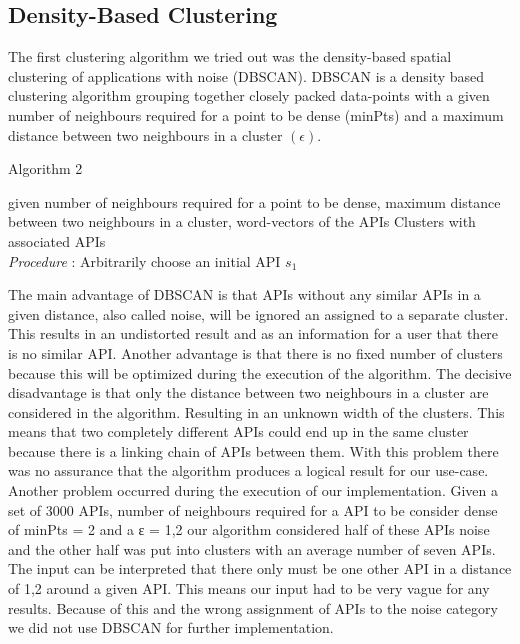 \documentclass[a4paper]{IEEEtran}
\begin{document}
\subsection{Density-Based Clustering}
The first clustering algorithm we tried out was the density-based spatial clustering of applications with noise (DBSCAN). DBSCAN\cite{kanungo2002efficient} is a density based clustering algorithm grouping together closely packed data-points with a given number of neighbours required for a point to be dense (minPts) and a maximum distance between two neighbours in a cluster $(\epsilon)$. 

\begin{algorithm}[H]
 \caption{Algorithm 2}
 \begin{algorithmic}[1]
\renewcommand{\algorithmicrequire}{\textbf{Input:}}
 \renewcommand{\algorithmicensure}{\textbf{Output:}}
 \REQUIRE given number of neighbours required for a point to be dense, \newline maximum distance between two
neighbours in a cluster, \newline word-vectors of the APIs
 \ENSURE  Clusters with associated APIs
 \\ \textit{Procedure} :
  \STATE Arbitrarily choose an initial API $s_1$
 \STATE 
 \end{algorithmic}
 \end{algorithm}

The main advantage of DBSCAN is that APIs without any similar APIs in a given distance, also called noise, will be ignored an assigned to a separate cluster. This results in an undistorted result and as an information for a user that there is no similar API. 
Another advantage is that there is no fixed number of clusters because this will be optimized during the execution of the algorithm.
The decisive disadvantage is that only the distance between two neighbours in a cluster are considered in the algorithm. Resulting in an unknown width of the clusters. This means that two completely different APIs could end up in the same cluster because there is a linking chain of APIs between them. With this problem there was no assurance that the algorithm produces a logical result for our use-case.
Another problem occurred during the execution of our implementation. Given a set of 3000 APIs, number of neighbours required for a API to be consider dense of minPts = 2 and a ε = 1,2 our algorithm considered half of these APIs noise and the other half was put into clusters with an average number of seven APIs. The input can be interpreted that there only must be one other API in a distance of 1,2 around a given API. This means our input had to be very vague for any results. Because of this and the wrong assignment of APIs to the noise category we did not use DBSCAN for further implementation.
\end{document}
